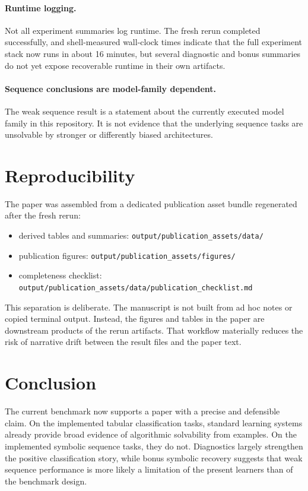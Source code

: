 \documentclass[11pt]{article}
\begin{document}
\paragraph{Runtime logging.}
Not all experiment summaries log runtime. The fresh rerun completed successfully, and shell-measured wall-clock times indicate that the full experiment stack now runs in about 16 minutes, but several diagnostic and bonus summaries do not yet expose recoverable runtime in their own artifacts.

\paragraph{Sequence conclusions are model-family dependent.}
The weak sequence result is a statement about the currently executed model family in this repository. It is not evidence that the underlying sequence tasks are unsolvable by stronger or differently biased architectures.

\section{Reproducibility}

The paper was assembled from a dedicated publication asset bundle regenerated after the fresh rerun:

\begin{itemize}
  \item derived tables and summaries: \texttt{output/publication\_assets/data/}
  \item publication figures: \texttt{output/publication\_assets/figures/}
  \item completeness checklist: \texttt{output/publication\_assets/data/publication\_checklist.md}
\end{itemize}

This separation is deliberate. The manuscript is not built from ad hoc notes or copied terminal output. Instead, the figures and tables in the paper are downstream products of the rerun artifacts. That workflow materially reduces the risk of narrative drift between the result files and the paper text.

\section{Conclusion}

The current benchmark now supports a paper with a precise and defensible claim. On the implemented tabular classification tasks, standard learning systems already provide broad evidence of algorithmic solvability from examples. On the implemented symbolic sequence tasks, they do not. Diagnostics largely strengthen the positive classification story, while bonus symbolic recovery suggests that weak sequence performance is more likely a limitation of the present learners than of the benchmark design.
\end{document}
